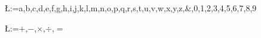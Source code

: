 \documentclass[a4paper]{article}
\newcommand{\outerbox}[1]{\framebox{#1}}
\renewcommand{\outerbox}[1]{#1}
\begin{document}
\pagestyle{empty}

\setlength{\fboxsep}{30pt}

\makeatletter
\@for\L:={a,b,c,d,e,f,g,h,i,j,k,l,m,n,o,p,q,r,s,t,u,v,w,x,y,z,\&,0,1,2,3,4,5,6,7,8,9}\do{
  ~

  \vfill

  \centering\noindent\outerbox{\resizebox*{0.86\textwidth}{!}{\makebox[1em]{\strut\scshape\L}}}

  \vfill
  ~

  \pagebreak}

\@for\L:={$+$,$-$,$\times$,$\div$,$=$}\do{
  ~

  \vfill

  \centering\noindent\outerbox{\scalebox{1.75}{\fontsize{250}{260}\selectfont{\strut\L}}}

  \vfill
  ~

  \pagebreak}


\makeatother
\end{document}
